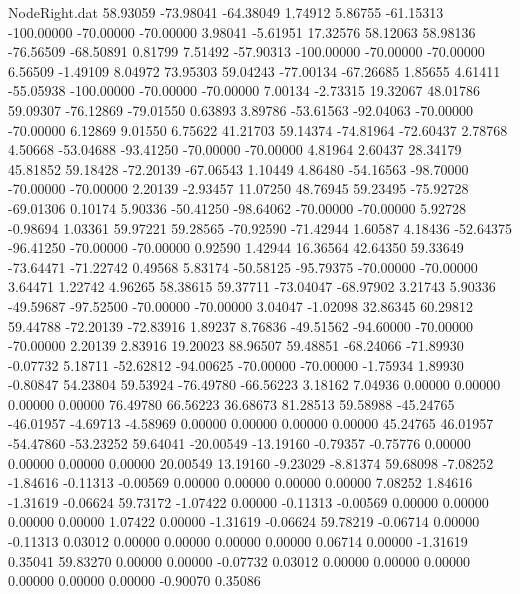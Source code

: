 \begin{filecontents}{NodeRight.dat}
  58.93059  -73.98041  -64.38049     1.74912    5.86755  -61.15313 -100.00000  -70.00000  -70.00000    3.98041   -5.61951   17.32576   58.12063
  58.98136  -76.56509  -68.50891     0.81799    7.51492  -57.90313 -100.00000  -70.00000  -70.00000    6.56509   -1.49109    8.04972   73.95303
  59.04243  -77.00134  -67.26685     1.85655    4.61411  -55.05938 -100.00000  -70.00000  -70.00000    7.00134   -2.73315   19.32067   48.01786
  59.09307  -76.12869  -79.01550     0.63893    3.89786  -53.61563  -92.04063  -70.00000  -70.00000    6.12869    9.01550    6.75622   41.21703
  59.14374  -74.81964  -72.60437     2.78768    4.50668  -53.04688  -93.41250  -70.00000  -70.00000    4.81964    2.60437   28.34179   45.81852
  59.18428  -72.20139  -67.06543     1.10449    4.86480  -54.16563  -98.70000  -70.00000  -70.00000    2.20139   -2.93457   11.07250   48.76945
  59.23495  -75.92728  -69.01306     0.10174    5.90336  -50.41250  -98.64062  -70.00000  -70.00000    5.92728   -0.98694    1.03361   59.97221
  59.28565  -70.92590  -71.42944     1.60587    4.18436  -52.64375  -96.41250  -70.00000  -70.00000    0.92590    1.42944   16.36564   42.64350
  59.33649  -73.64471  -71.22742     0.49568    5.83174  -50.58125  -95.79375  -70.00000  -70.00000    3.64471    1.22742    4.96265   58.38615
  59.37711  -73.04047  -68.97902     3.21743    5.90336  -49.59687  -97.52500  -70.00000  -70.00000    3.04047   -1.02098   32.86345   60.29812
  59.44788  -72.20139  -72.83916     1.89237    8.76836  -49.51562  -94.60000  -70.00000  -70.00000    2.20139    2.83916   19.20023   88.96507
  59.48851  -68.24066  -71.89930    -0.07732    5.18711  -52.62812  -94.00625  -70.00000  -70.00000   -1.75934    1.89930   -0.80847   54.23804
  59.53924  -76.49780  -66.56223     3.18162    7.04936    0.00000    0.00000    0.00000    0.00000   76.49780   66.56223   36.68673   81.28513
  59.58988  -45.24765  -46.01957    -4.69713   -4.58969    0.00000    0.00000    0.00000    0.00000   45.24765   46.01957  -54.47860  -53.23252
  59.64041  -20.00549  -13.19160    -0.79357   -0.75776    0.00000    0.00000    0.00000    0.00000   20.00549   13.19160   -9.23029   -8.81374
  59.68098   -7.08252   -1.84616    -0.11313   -0.00569    0.00000    0.00000    0.00000    0.00000    7.08252    1.84616   -1.31619   -0.06624
  59.73172   -1.07422    0.00000    -0.11313   -0.00569    0.00000    0.00000    0.00000    0.00000    1.07422    0.00000   -1.31619   -0.06624
  59.78219   -0.06714    0.00000    -0.11313    0.03012    0.00000    0.00000    0.00000    0.00000    0.06714    0.00000   -1.31619    0.35041
  59.83270    0.00000    0.00000    -0.07732    0.03012    0.00000    0.00000    0.00000    0.00000    0.00000    0.00000   -0.90070    0.35086

\end{filecontents}
